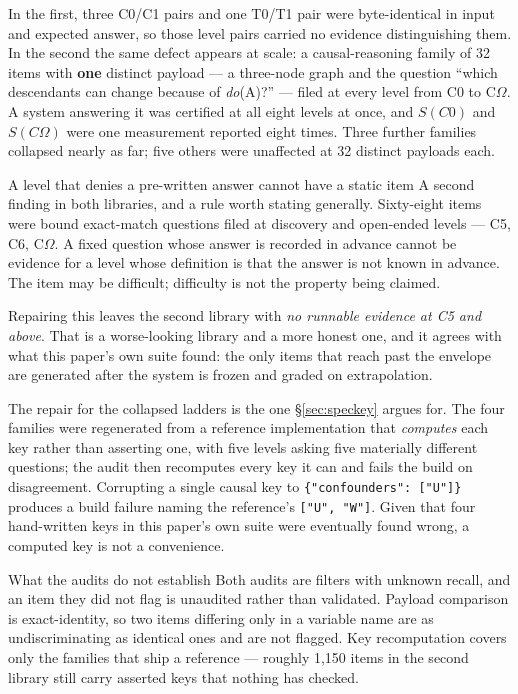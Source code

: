\documentclass[11pt]{article}
\theoremstyle{definition}
\newcommand{\Om}{\ensuremath{\Omega}}
\begin{document}
In the first, three C0/C1 pairs and one T0/T1 pair were byte-identical in input and expected answer, so those level pairs carried no evidence distinguishing them. In the second the same defect appears at scale: a causal-reasoning family of 32 items with \textbf{one} distinct payload --- a three-node graph and the question ``which descendants can change because of \emph{do}(A)?'' --- filed at every level from C0 to C\Om{}. A system answering it was certified at all eight levels at once, and $S(C0)$ and $S(C\Om{})$ were one measurement reported eight times. Three further families collapsed nearly as far; five others were unaffected at 32 distinct payloads each.

\begin{claimbox}{A level that denies a pre-written answer cannot have a static item}
A second finding in both libraries, and a rule worth stating generally. Sixty-eight items were bound exact-match questions filed at discovery and open-ended levels --- C5, C6, C\Om{}. A fixed question whose answer is recorded in advance cannot be evidence for a level whose definition is that the answer is not known in advance. The item may be difficult; difficulty is not the property being claimed.

Repairing this leaves the second library with \emph{no runnable evidence at C5 and above}. That is a worse-looking library and a more honest one, and it agrees with what this paper's own suite found: the only items that reach past the envelope are generated after the system is frozen and graded on extrapolation.
\end{claimbox}

The repair for the collapsed ladders is the one \S\ref{sec:speckey} argues for. The four families were regenerated from a reference implementation that \emph{computes} each key rather than asserting one, with five levels asking five materially different questions; the audit then recomputes every key it can and fails the build on disagreement. Corrupting a single causal key to \texttt{\{"confounders": ["U"]\}} produces a build failure naming the reference's \texttt{["U", "W"]}. Given that four hand-written keys in this paper's own suite were eventually found wrong, a computed key is not a convenience.

\begin{cautionbox}{What the audits do not establish}
Both audits are filters with unknown recall, and an item they did not flag is unaudited rather than validated. Payload comparison is exact-identity, so two items differing only in a variable name are as undiscriminating as identical ones and are not flagged. Key recomputation covers only the families that ship a reference --- roughly 1{,}150 items in the second library still carry asserted keys that nothing has checked.
\end{cautionbox}
\end{document}
